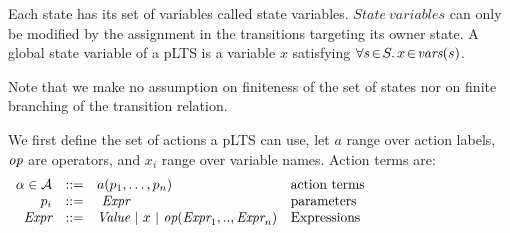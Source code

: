 \documentclass{lncs/llncs}
\newcommand{\QIN}[1]{\textcolor{airforceblue}{#1}}
\def\AlgA{\mathcal{A}}
\begin{document}
Each state has its set of variables called state variables.
$State\ variables$ can only be modified by the assignment in the transitions targeting its owner state. 
A global state variable of a pLTS is a variable $x$ satisfying $\forall s\!\in\! S .\, x\!\in\! \vars(s)$.

Note that we make no assumption on finiteness of the set of states nor
on finite branching of the transition relation.

We first define the set of actions a pLTS can use, let $a$
range over action labels, $\symb{op}$ are operators, and $x_i$ range over
variable names. Action terms are:
\[
\begin{array}[l]{rcl@{\quad}p{5.5cm}}
  \alpha\in\AlgA&::=&a(p_1,\ldots,p_n)&\text{action terms}\\
  p_i&::=& ~\symb{Expr}&\text{parameters}\\
  \symb{Expr}&::=& \symb{Value}~|~x~|~\symb{op}(\symb{Expr}_1,..,\symb{Expr}_n)&\text{Expressions}
\end{array}
\]

\end{document}
